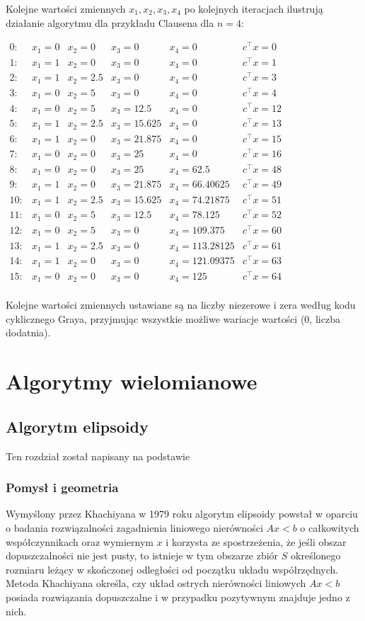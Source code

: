 \documentclass[licencjacka]{pracamgr}
\begin{document}
Kolejne wartości zmiennych $x_1,x_2,x_3,x_4$ po kolejnych iteracjach ilustrują działanie algorytmu dla przykładu Clausena dla $n=4$:
\begin{center}$
\begin{array}{cccccc}
0:&x_1=0&x_2=0&x_3=0&x_4=0&c^{\top}x=0\\
1:&x_1=1&x_2=0&x_3=0&x_4=0&c^{\top}x=1\\
2:&x_1=1&x_2=2.5&x_3=0&x_4=0&c^{\top}x=3\\
3:&x_1=0&x_2=5&x_3=0&x_4=0&c^{\top}x=4\\
4:&x_1=0&x_2=5&x_3=12.5&x_4=0&c^{\top}x=12\\
5:&x_1=1&x_2=2.5&x_3=15.625&x_4=0&c^{\top}x=13\\
6:&x_1=1&x_2=0&x_3=21.875&x_4=0&c^{\top}x=15\\
7:&x_1=0&x_2=0&x_3=25&x_4=0&c^{\top}x=16\\
8:&x_1=0&x_2=0&x_3=25&x_4=62.5&c^{\top}x=48\\
9:&x_1=1&x_2=0&x_3=21.875&x_4=66.40625&c^{\top}x=49\\
10:&x_1=1&x_2=2.5&x_3=15.625&x_4=74.21875&c^{\top}x=51\\
11:&x_1=0&x_2=5&x_3=12.5&x_4=78.125&c^{\top}x=52\\
12:&x_1=0&x_2=5&x_3=0&x_4=109.375&c^{\top}x=60\\
13:&x_1=1&x_2=2.5&x_3=0&x_4=113.28125&c^{\top}x=61\\
14:&x_1=1&x_2=0&x_3=0&x_4=121.09375&c^{\top}x=63\\
15:&x_1=0&x_2=0&x_3=0&x_4=125&c^{\top}x=64\\
\end{array}$\end{center}

Kolejne wartości zmiennych ustawiane są na liczby niezerowe i zera według kodu cyklicznego Graya, przyjmując wszystkie możliwe wariacje wartości (0, liczba dodatnia).\newline
%
 \chapter{Algorytmy wielomianowe}\label{r:wiel}
  \section{Algorytm elipsoidy}
Ten rozdział został napisany na podstawie \cite{SDK}
   \subsection{Pomysł i geometria}
Wymyślony przez Khachiyana w 1979 roku algorytm elipsoidy powstał w oparciu o badania rozwiązalności zagadnienia liniowego nierówności $Ax<b$ o całkowitych współczynnikach oraz wymiernym $x$
i korzysta ze spostrzeżenia, że jeśli obszar dopuszczalności nie jest pusty,
to istnieje w tym obszarze zbiór $S$ określonego rozmiaru leżący w skończonej odległości od początku układu współrzędnych.
Metoda Khachiyana określa, czy układ ostrych nierówności liniowych $Ax<b$ posiada rozwiązania dopuszczalne i w przypadku pozytywnym znajduje jedno z nich.
\end{document}
